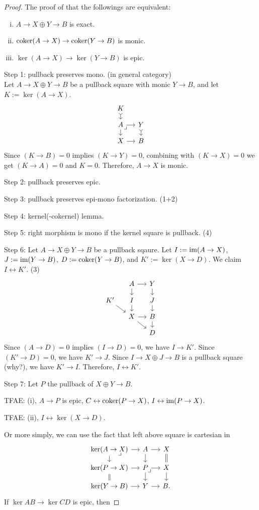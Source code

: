 \documentclass{../../large}
\begin{document}
\begin{proof}
The proof of that the followings are equivalent:
\begin{enumerate}[(i)]
\item $A\to X\oplus Y\to B$ is exact.
\item $\operatorname{coker}(A\to X)\to\operatorname{coker}(Y\to B)$ is monic.
\item $\ker(A\to X)\to\ker(Y\to B)$ is epic.
\end{enumerate}

Step 1: pullback preserves mono. (in general category)\\
Let $A\to X\oplus Y\to B$ be a pullback square with monic $Y\to B$, and let $K:=\ker(A\to X)$. 
\[\begin{tikzcd}[sep=small]
K \dar[>->] & \\
A \rar\dar \pullback & Y \dar[>->] \\
X \rar & B
\end{tikzcd}\]
Since $(K\to B)=0$ implies $(K\to Y)=0$, combining with $(K\to X)=0$ we get $(K\to A)=0$ and $K=0$.
Therefore, $A\to X$ is monic.

Step 2: pullback preserves epic.


Step 3: pullback preserves epi-mono factorization. (1+2)


Step 4: kernel(-cokernel) lemma.

Step 5: right morphism is mono if the kernel square is pullback. (4)

Step 6: Let $A\to X\oplus Y\to B$ be a pullback sqaure.
Let $I:=\operatorname{im}(A\to X)$, $J:=\operatorname{im}(Y\to B)$, $D:=\operatorname{coker}(Y\to B)$, and $K':=\ker(X\to D)$.
We claim $I\leftrightarrow K'$. (3)
\[\begin{tikzcd}[sep=small]
 &A\dar\rar&Y\dar \\
K'\ar{dr}&I\dar&J\dar \\
 &X\rar\ar{dr}&B\dar \\
 & &D
\end{tikzcd}\]
Since $(A\to D)=0$ implies $(I\to D)=0$, we have $I\to K'$.
Since $(K'\to D)=0$, we have $K'\to J$.
Since $I\to X\oplus J\to B$ is a pullback square (why?), we have $K'\to I$.
Therefore, $I\leftrightarrow K'$.


Step 7: Let $P$ the pullback of $X\oplus Y\to B$.

TFAE: (i), $A\to P$ is epic, $C\leftrightarrow\operatorname{coker}(P\to X)$, $I\leftrightarrow\operatorname{im}(P\to X)$.

TFAE: (ii), $I\leftrightarrow\ker(X\to D)$.



Or more simply, we can use the fact that left above square is cartesian in
\[\begin{tikzcd}[sep=small]
\ker(A\to X) \rar\dar\pullback & A \rar\dar & X \dar[equal]\\
\ker(P\to X) \rar\dar[equal] & P \rar\dar\pullback & X \dar\\
\ker(Y\to B) \rar & Y \rar & B.
\end{tikzcd}\]
If $\ker AB\to\ker CD$ is epic, then 
\end{proof}
\end{document}
